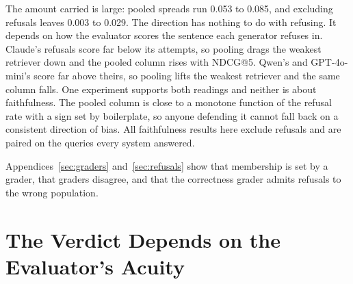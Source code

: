 \documentclass[11pt]{article}
\begin{document}
\begin{table}[t]
\centering
{}
\caption{Pooling refusals into the faithfulness average gives a column that tracks retrieval quality in every generator, in opposite directions ($\rho$ = Spearman against NDCG@5 over the four systems). Excluding them collapses the spread and the ordering follows retrieval quality in none of the three.}
\label{tab:4}
\end{table}

The amount carried is large: pooled spreads run 0.053 to 0.085, and excluding refusals leaves 0.003 to 0.029. The direction has nothing to do with refusing. It depends on how the evaluator scores the sentence each generator refuses in. Claude's refusals score far below its attempts, so pooling drags the weakest retriever down and the pooled column rises with NDCG@5. Qwen's and GPT-4o-mini's score far above theirs, so pooling lifts the weakest retriever and the same column falls. One experiment supports both readings and neither is about faithfulness. The pooled column is close to a monotone function of the refusal rate with a sign set by boilerplate, so anyone defending it cannot fall back on a consistent direction of bias. All faithfulness results here exclude refusals and are paired on the queries every system answered.

Appendices~\ref{sec:graders} and~\ref{sec:refusals} show that membership is set by a grader, that graders disagree, and that the correctness grader admits refusals to the wrong population.


\section{The Verdict Depends on the Evaluator's Acuity}
\label{sec:verdict}
\end{document}
